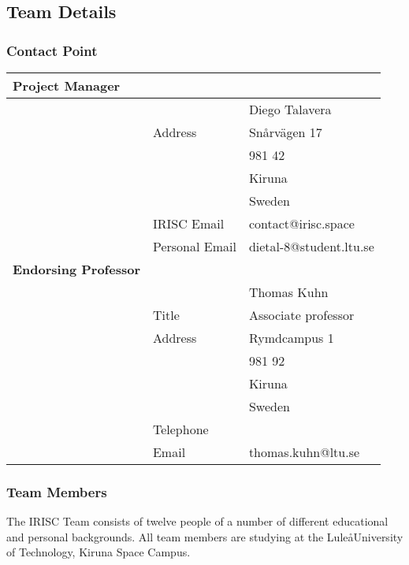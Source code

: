 \subsection{Team Details}
\subsubsection{Contact Point}


\begin{tabular}{m{} m{} m{}}
	\textbf{Project Manager} & & \\	\hline
	 & & Diego Talavera \\
	 & Address & Snårvägen 17 \\
	 & & 981 42 \\
	 & & Kiruna \\
	 & & Sweden \\ 
	 & IRISC Email & contact@irisc.space \\
	 & Personal Email & dietal-8@student.ltu.se\\
	 \textbf{Endorsing Professor} & & \\ \hline
	 & & Thomas Kuhn \\
	 & Title & Associate professor \\
	 & Address & Rymdcampus 1 \\
	 & &  981 92 \\
	 & & Kiruna \\
	 & & Sweden \\
	 & Telephone & \\
	 & Email & thomas.kuhn@ltu.se \\

\end{tabular}

\subsubsection{Team Members}
The IRISC Team consists of twelve people of a number of different educational and personal backgrounds. All team members are studying at the Lule\aa University of Technology, Kiruna Space Campus. 

\bigskip

